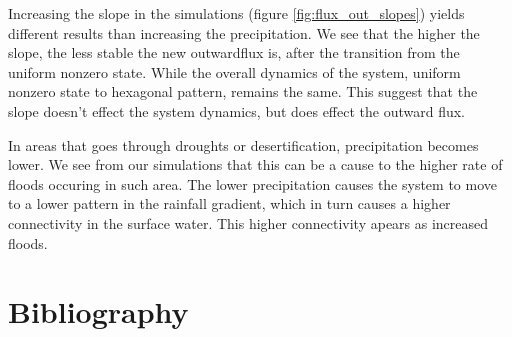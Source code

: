 \documentclass{article}
\numberwithin{equation}{section}
\begin{document}
Increasing the slope in the simulations (figure \ref{fig:flux_out_slopes}) yields different results than increasing the precipitation. We see that the higher the slope, the less stable the new outwardflux is, after the transition from the uniform nonzero state. While the overall dynamics of the system, uniform nonzero state to hexagonal pattern, remains the same. This suggest that the slope doesn't effect the system dynamics, but does effect the outward flux.

In areas that goes through droughts or desertification, precipitation becomes lower. We see from our simulations that this can be a cause to the higher rate of floods occuring in such area. The lower precipitation causes the system to move to a lower pattern in the rainfall gradient, which in turn causes a higher connectivity in the surface water. This higher connectivity apears as increased floods.

\section{Bibliography}
\printbibliography
\end{document}
